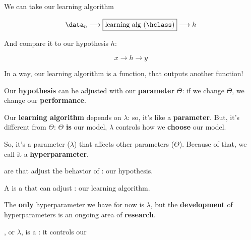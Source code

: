         We can take our learning algorithm
        
        \begin{equation*}
            \data_n \longrightarrow 
            \boxed{\text{learning alg ($\hclass$)}} 
            \longrightarrow h
        \end{equation*}
        
        And compare it to our hypothesis $h$:
        
        $$ x \rightarrow \boxed{h} \rightarrow y $$
        
        In a way, our learning algorithm is a function, that outputs another function!
        
        Our \textbf{hypothesis} can be adjusted with our \textbf{parameter} $\Theta$: if we change $\Theta$, we change our \textbf{performance}.
        
        Our \textbf{learning algorithm} depends on $\lambda$: so, it's like a \textbf{parameter}. But, it's different from $\Theta$: $\Theta$ \textbf{is} our model, $\lambda$ controls how we \textbf{choose} our model.
        
        So, it's a parameter ($\lambda$) that affects other parameters ($\Theta$). Because of that, we call it a \textbf{hyperparameter}.
        \\
        
        \begin{definition}
             are  that adjust the behavior of : our hypothesis.
            
            A  is a  that can adjust : our learning algorithm. 
        \end{definition}
        
        The \textbf{only} hyperparameter we have for now is $\lambda$, but the \textbf{development} of hyperparameters is an ongoing area of \textbf{research}.\\
        
        \begin{concept}
            , or $\lambda$, is a : it controls our 
        \end{concept}
        
